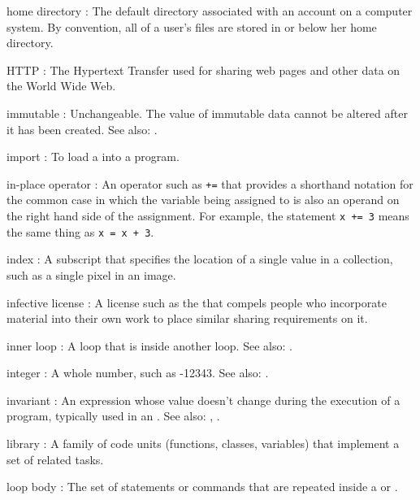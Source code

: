 \documentclass{book}
\begin{document}
\begin{swcdescription}
\item[home directory]:
The default directory associated with an
account on a computer system. By convention, all of a user's files are
stored in or below her home directory.

\item[HTTP]:
The Hypertext Transfer  used for sharing web pages and other data
on the World Wide Web.

\item[immutable]:
Unchangeable. The value of immutable data cannot be
altered after it has been created. See also:
.

\item[import]:
To load a  into a program.

\item[in-place operator]:
An operator such as \texttt{+=} that
provides a shorthand notation for the common case in which the variable
being assigned to is also an operand on the right hand side of the
assignment. For example, the statement \texttt{x += 3} means the same
thing as \texttt{x = x + 3}.

\item[index]:
A subscript that specifies the location of a single
value in a collection, such as a single pixel in an image.

\item[infective license]:
A license such as the
 that compels people
who incorporate material into their own work to place similar sharing
requirements on it.

\item[inner loop]:
A loop that is inside another loop. See also:
.

\item[integer]:
A whole number, such as -12343. See also:
.

\item[invariant]:
An expression whose value doesn't change during the
execution of a program, typically used in an
. See also:
,
.

\item[library]:
A family of code units (functions, classes, variables)
that implement a set of related tasks.

\item[loop body]:
The set of statements or commands that are repeated inside a 
or .


\end{swcdescription}
\end{document}
